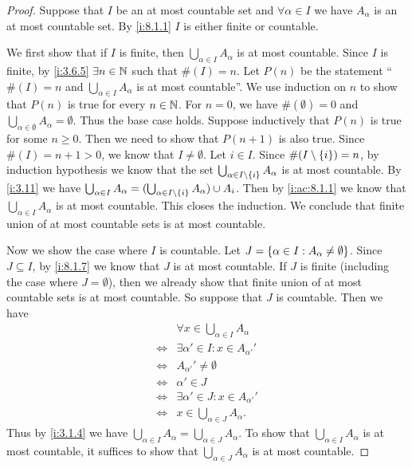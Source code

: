 \begin{proof}
  Suppose that \(I\) be an at most countable set and \(\forall \alpha \in I\) we have \(A_{\alpha}\) is an at most countable set.
  By \cref{i:8.1.1} \(I\) is either finite or countable.

  We first show that if \(I\) is finite, then \(\bigcup_{\alpha \in I} A_{\alpha}\) is at most countable.
  Since \(I\) is finite, by \cref{i:3.6.5} \(\exists n \in \mathbb{N}\) such that \(\#(I) = n\).
  Let \(P(n)\) be the statement ``\(\#(I) = n\) and \(\bigcup_{\alpha \in I} A_{\alpha}\) is at most countable''.
  We use induction on \(n\) to show that \(P(n)\) is true for every \(n \in \mathbb{N}\).
  For \(n = 0\), we have \(\#(\emptyset) = 0\) and \(\bigcup_{\alpha \in \emptyset} A_{\alpha} = \emptyset\).
  Thus the base case holds.
  Suppose inductively that \(P(n)\) is true for some \(n \geq 0\).
  Then we need to show that \(P(n + 1)\) is also true.
  Since \(\#(I) = n + 1 > 0\), we know that \(I \neq \emptyset\).
  Let \(i \in I\).
  Since \(\#(I \setminus \left\lbrace i\right\rbrace) = n\), by induction hypothesis we know that the set \(\bigcup_{\alpha \in I \setminus \left\lbrace i\right\rbrace} A_{\alpha}\) is at most countable.
  By \cref{i:3.11} we have \(\bigcup_{\alpha \in I} A_{\alpha} = (\bigcup_{\alpha \in I \setminus \left\lbrace i\right\rbrace} A_{\alpha}) \cup A_i\).
  Then by \cref{i:ac:8.1.1} we know that \(\bigcup_{\alpha \in I} A_{\alpha}\) is at most countable.
  This closes the induction.
  We conclude that finite union of at most countable sets is at most countable.

  Now we show the case where \(I\) is countable.
  Let \(J = \left\lbrace\alpha \in I : A_{\alpha} \neq \emptyset\right\rbrace\).
  Since \(J \subseteq I\), by \cref{i:8.1.7} we know that \(J\) is at most countable.
  If \(J\) is finite (including the case where \(J = \emptyset\)), then we already show that finite union of at most countable sets is at most countable.
  So suppose that \(J\) is countable.
  Then we have
  \begin{align*}
         & \forall x \in \bigcup_{\alpha \in I} A_{\alpha} \\
    \iff & \exists \alpha' \in I : x \in A_{\alpha'}'      \\
    \iff & A_{\alpha'}' \neq \emptyset                     \\
    \iff & \alpha' \in J                                   \\
    \iff & \exists \alpha' \in J : x \in A_{\alpha'}'      \\
    \iff & x \in \bigcup_{\alpha \in J} A_{\alpha}.
  \end{align*}
  Thus by \cref{i:3.1.4} we have \(\bigcup_{\alpha \in I} A_{\alpha} = \bigcup_{\alpha \in J} A_{\alpha}\).
  To show that \(\bigcup_{\alpha \in I} A_{\alpha}\) is at most countable, it suffices to show that \(\bigcup_{\alpha \in J} A_{\alpha}\) is at most countable.


\end{proof}
